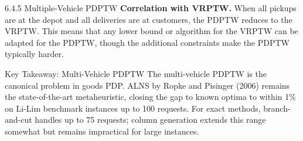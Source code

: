 \documentclass[aspectratio=169,10pt]{beamer}
\begin{document}
\begin{frame}[allowframebreaks]{6.4.5 Multiple-Vehicle PDPTW}
  \textbf{Correlation with VRPTW.} When all pickups are at the depot and all deliveries
  are at customers, the PDPTW reduces to the VRPTW. This means that any lower bound or
  algorithm for the VRPTW can be adapted for the PDPTW, though the additional constraints
  make the PDPTW typically harder.

  \begin{alertblock}{Key Takeaway: Multi-Vehicle PDPTW}
    The multi-vehicle PDPTW is the canonical problem in goods PDP. ALNS by Ropke and
    Pisinger (2006) remains the state-of-the-art metaheuristic, closing the gap to
    known optima to within 1\% on Li-Lim benchmark instances up to 100 requests.
    For exact methods, branch-and-cut handles up to 75 requests; column generation
    extends this range somewhat but remains impractical for large instances.
  \end{alertblock}

\end{frame}
\end{document}
